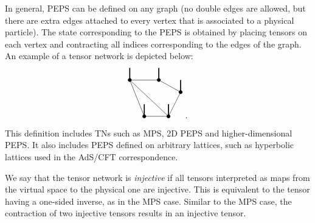 \documentclass[preprint, superscriptaddress,a4paper,longbibliography]{revtex4-1}
\theoremstyle{definition}
\begin{document}
In general, PEPS can be defined on any graph (no double edges are allowed, but there are extra edges attached to every vertex that is associated to a physical particle). The state corresponding to the PEPS is obtained by placing tensors on each vertex and contracting all indices corresponding to the edges of the graph. An example of a tensor network is depicted below:
\begin{equation*}
    \begin{tikzpicture}
        \coordinate (c1) at (0,0);
        \coordinate (c2) at (1,0);
        \coordinate (c3) at (1.5,1);
        \coordinate (c4) at (0.6,1.5);
        \coordinate (c5) at (-0.6,1.5);
        \foreach \x in {1,2,3,4,5}{
                \filldraw (c\x) circle (0.07);
                \draw[very thick] (c\x) --++(0,0.5);
            }
        \draw (c1)--(c2)--(c3)--(c4)--(c5)--(c1);
        \draw (c2)--(c5);
    \end{tikzpicture} \ .
\end{equation*}
This definition includes TNs such as MPS, 2D PEPS and higher-dimensional PEPS. It also includes PEPS defined on arbitrary lattices, such as hyperbolic lattices used in the AdS/CFT correspondence\cite{Pastawski2015,Hayden2016}.

We say that the tensor network is \emph{injective} if all tensors interpreted as maps from the virtual space to the physical one are injective. This is equivalent to the tensor having a one-sided inverse, as in the MPS case. Similar to the MPS case, the contraction of two injective tensors results in an injective tensor.
\end{document}
